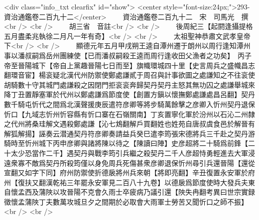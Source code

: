 <div class="info_txt clearfix" id="show">
<center style="font-size:24px;">293-資治通鑑卷二百九十二</center>
  　　資治通鑑卷二百九十二　宋　司馬光　撰<br />
<br />
　　胡三省　音註<br />
<br />
　　後周紀三【起閼逢攝提格五月盡柔兆執徐二月凡一年有奇】<br />
<br />
　　太祖聖神恭肅文武孝皇帝下<br />
<br />
　　顯德元年五月甲戌朔王逵自潭州遷于朗州以周行逢知潭州事以潘叔嗣爲岳州團練使【已而潘叔嗣殺王逵而周行逢收田父漁者之功矣】　丙子帝至晉陽城下【帝自上黨趣晉陽七日而至】旗幟環城四十里【史言周兵之盛幟昌志翻環音宦】楊衮疑北漢代州防禦使鄭處謙貳于周召與計事欲圖之處謙知之不往衮使胡騎數十守其城門處謙殺之因閉門拒衮衮奔歸契丹契丹主怒其無功囚之處謙舉城來降丁丑置靜塞軍於代州以鄭處謙爲節度使【創置方鎭以懷撫鄭處謙處昌呂翻】契丹數千騎屯忻代之間爲北漢聲援庚辰遣符彦卿等將步騎萬餘擊之彦卿入忻州契丹退保忻口【九域志忻州忻容縣有忻口寨在石嶺關南】丁亥置寧化軍於汾州以石沁二州隸之代州將桑珪解文遇殺鄭處謙【沁七鴆翻解戶買翻姓也姓苑自唐叔虞食邑於解晉有解狐解揚】誣奏云潜通契丹符彦卿奏請益兵癸巳遣李筠張宋德將兵三千赴之契丹游騎時至忻州城下丙申彦卿與諸將陳以待之【陳讀曰陣】史彦超將二十騎爲前鋒【二十太少恐當作二千】遇契丹與戰李筠引兵繼之殺契丹二千人彦超恃勇輕進去大軍浸遠衆寡不敵爲契丹所殺筠僅以身免周兵死傷甚衆彦卿退保忻州尋引兵還晉陽【還從宣翻又如字下同】府州防禦使折德扆將州兵來朝【將即亮翻】辛丑復置永安軍於府州【復扶又翻漢乾祐三年罷永安軍見二百八十九卷】以德扆爲節度使時大發兵夫東自懷孟西及蒲陜以攻晉陽不克會久雨士卒疲病乃議引還【陜失冉翻考異曰世宗實録徵懷孟蒲陜丁夫數萬攻城旦夕之間期於必取會大雨軍士勞苦又聞忻口之師不振】<br />
<br />
